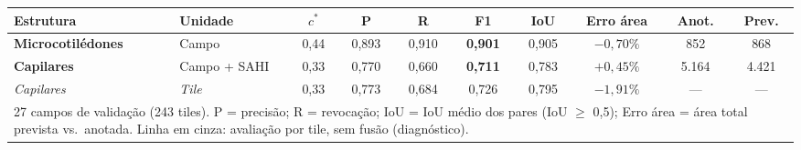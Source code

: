 \documentclass[border=12pt]{standalone}
\begin{document}
\begin{tabular}{l l c c c c c c c c}
\toprule
\textbf{Estrutura} & \textbf{Unidade} & $c^{*}$ & \textbf{P} & \textbf{R} & \textbf{F1} & \textbf{IoU} & \textbf{Erro área} & \textbf{Anot.} & \textbf{Prev.} \\
\midrule
\rowcolor{zebra}
\textbf{\color{micro}Microcotilédones} & Campo & 0,44 & 0,893 & 0,910 & \textbf{0,901} & 0,905 & $-0{,}70\%$ & 852 & 868 \\
\textbf{\color{cap}Capilares} & Campo + SAHI & 0,33 & 0,770 & 0,660 & \textbf{0,711} & 0,783 & $+0{,}45\%$ & 5.164 & 4.421 \\
\rowcolor{zebra}
{\color{diag}\textit{Capilares}} & {\color{diag}\textit{Tile}} & {\color{diag}0,33} & {\color{diag}0,773} & {\color{diag}0,684} & {\color{diag}0,726} & {\color{diag}0,795} & {\color{diag}$-1{,}91\%$} & {\color{diag}---} & {\color{diag}---} \\
\bottomrule
\multicolumn{10}{p{14.5cm}}{\footnotesize 27 campos de validação (243 tiles). P = precisão; R = revocação; IoU = IoU médio dos pares (IoU $\geq$ 0,5); Erro área = área total prevista vs.\ anotada. Linha em cinza: avaliação por tile, sem fusão (diagnóstico).} \\
\end{tabular}
\end{document}
